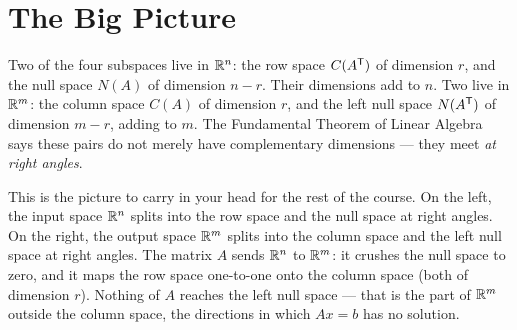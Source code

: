 \section{The Big Picture}

Two of the four subspaces live in $\mathbb{R}^n$: the row space $C(A^{\mathsf T})$ of dimension $r$, and the null space $N(A)$ of dimension $n-r$. Their dimensions add to $n$. Two live in $\mathbb{R}^m$: the column space $C(A)$ of dimension $r$, and the left null space $N(A^{\mathsf T})$ of dimension $m-r$, adding to $m$. The Fundamental Theorem of Linear Algebra says these pairs do not merely have complementary dimensions --- they meet \emph{at right angles}.


This is the picture to carry in your head for the rest of the course. On the left, the input space $\mathbb{R}^n$ splits into the row space and the null space at right angles. On the right, the output space $\mathbb{R}^m$ splits into the column space and the left null space at right angles. The matrix $A$ sends $\mathbb{R}^n$ to $\mathbb{R}^m$: it crushes the null space to zero, and it maps the row space one-to-one onto the column space (both of dimension $r$). Nothing of $A$ reaches the left null space --- that is the part of $\mathbb{R}^m$ outside the column space, the directions in which $Ax=b$ has no solution.

